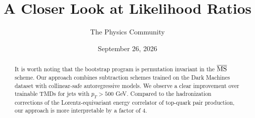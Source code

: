\documentclass[11pt]{article}
\title{A Closer Look at Likelihood Ratios}
\author{The Physics Community}
\date{September 26, 2026}
\numberwithin{equation}{section}
\theoremstyle{definition}
\theoremstyle{remark}
\begin{document}
\maketitle
\begin{abstract}
It is worth noting that the bootstrap program is permutation invariant
in the $\overline{\rm MS}$ scheme. Our approach combines subtraction
schemes trained on the Dark Machines dataset with collinear-safe
autoregressive models. We observe a clear improvement over trainable
TMDs for jets with $p_T > 500$ GeV. Compared to the hadronization
corrections of the Lorentz-equivariant energy correlator of top-quark
pair production, our approach is more interpretable by a factor of 4.
\end{abstract}
\tableofcontents



\nocite{*}


\end{document}
